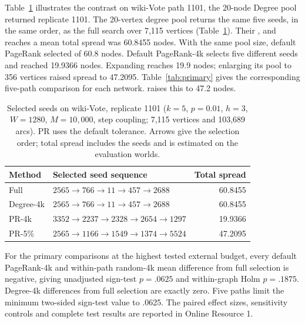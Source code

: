 \documentclass[smallextended]{svjour3}
\providecommand{\DIFaddtex}[1]{{\protect\color{blue} \sf #1}} %
\providecommand{\DIFdeltex}[1]{{\protect\color{red} \scriptsize #1}} %
\providecommand{\DIFaddbegin}{} %
\providecommand{\DIFaddend}{} %
\providecommand{\DIFdelbegin}{} %
\providecommand{\DIFdelend}{} %
\providecommand{\DIFadd}[1]{\texorpdfstring{\DIFaddtex{#1}}{#1}} %
\providecommand{\DIFdel}[1]{\texorpdfstring{\DIFdeltex{#1}}{}} %
\providecommand{\DIFscaledelfig}{0.5}
\newlength{\DIFdelgraphicswidth} %
\newlength{\DIFdelgraphicsheight} %
\providecommand{\DIFaddincludegraphics}[2][]{{\color{blue}\fbox{\DIFOincludegraphics[#1]{#2}}}} %
\providecommand{\DIFdelincludegraphics}[2][]{%
\sbox{\DIFdelgraphicsbox}{\DIFOincludegraphics[#1]{#2}}%
\settoboxwidth{\DIFdelgraphicswidth}{\DIFdelgraphicsbox} %
\settoboxtotalheight{\DIFdelgraphicsheight}{\DIFdelgraphicsbox} %
\scalebox{\DIFscaledelfig}{%
\parbox[b]{\DIFdelgraphicswidth}{\usebox{\DIFdelgraphicsbox}\\[-\baselineskip] \rule{\DIFdelgraphicswidth}{0em}}\llap{\resizebox{\DIFdelgraphicswidth}{\DIFdelgraphicsheight}{%
\setlength{\unitlength}{\DIFdelgraphicswidth}%
\begin{picture}(1,1)%
\thicklines\linethickness{2pt} %
{\color[rgb]{1,0,0}\put(0,0){\framebox(1,1){}}}%
{\color[rgb]{1,0,0}\put(0,0){\line( 1,1){1}}}%
{\color[rgb]{1,0,0}\put(0,1){\line(1,-1){1}}}%
\end{picture}%
}\hspace*{3pt}}} %
} %
\DeclareRobustCommand{\DIFaddbegin}{\DIFOaddbegin \let\includegraphics\DIFaddincludegraphics} %
\DeclareRobustCommand{\DIFaddend}{\DIFOaddend \let\includegraphics\DIFOincludegraphics} %
\DeclareRobustCommand{\DIFdelbegin}{\DIFOdelbegin \let\includegraphics\DIFdelincludegraphics} %
\DeclareRobustCommand{\DIFdelend}{\DIFOaddend \let\includegraphics\DIFOincludegraphics} %
\begin{document}
\DIFadd{Table~\ref{tab:case} illustrates the contrast on }\DIFaddend wiki-Vote \DIFdelbegin \DIFdel{path 1101, the 20-node Degree pool returned }\DIFdelend \DIFaddbegin \DIFadd{replicate 1101. The 20-vertex degree pool returns }\DIFaddend the same five seeds, in the same order, as the full search over 7,115 vertices\DIFdelbegin \DIFdel{(Table~\ref{tab:case}). Their }\DIFdelend \DIFaddbegin \DIFadd{, and reaches a }\DIFaddend mean total spread \DIFdelbegin \DIFdel{was 60.8455 nodes. With the same pool size, default PageRank selected }\DIFdelend \DIFaddbegin \DIFadd{of 60.8 nodes. Default PageRank-4k selects }\DIFaddend five different seeds and \DIFdelbegin \DIFdel{reached 19.9366 nodes. Expanding }\DIFdelend \DIFaddbegin \DIFadd{reaches 19.9 nodes; enlarging }\DIFaddend its pool to 356 vertices \DIFdelbegin \DIFdel{raised spread to 47.2095.
Table~\ref{tab:primary} gives the corresponding five-path comparison for each network.
}\DIFdelend \DIFaddbegin \DIFadd{raises this to 47.2 nodes.
}

\DIFaddend \begin{table}[htbp]
\caption{Selected seeds on wiki-Vote, replicate 1101 ($k=5$, $p=0.01$, $h=3$, $W=1280$, $M=10{,}000$, step coupling; 7,115 vertices and 103,689 arcs). PR uses the default tolerance. Arrows give the selection order; total spread includes the seeds and is estimated on the evaluation worlds.}\label{tab:case}
\begin{tabularx}{\linewidth}{lXr}\toprule
Method & Selected seed sequence & Total spread \\ \midrule
Full & $2565\to 766\to 11\to 457\to 2688$ & 60.8455 \\
Degree-4k & $2565\to 766\to 11\to 457\to 2688$ & 60.8455 \\
PR-4k & $3352\to 2237\to 2328\to 2654\to 1297$ & 19.9366 \\
PR-5\% & $2565\to 1166\to 1549\to 1374\to 5524$ & 47.2095 \\
\bottomrule\end{tabularx}
\end{table}

\DIFdelbegin \DIFdel{For the primary comparisons at the highest tested external budget, every default PageRank-4k and within-path random-4k mean difference from full selection is negative, giving unadjusted sign-test $p=.0625$ and within-graph Holm $p=.1875$. Degree-4k differences from full selection are exactly zero. Five paths limit the minimum two-sided sign-test value to .0625. The paired effect sizes, sensitivity controls and complete test results are reported in Online Resource 1.
}%
\end{document}
